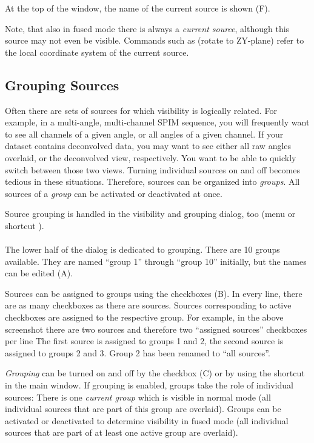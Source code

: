\documentclass{scrartcl}
\begin{document}
At the top of the window, the name of the current source is shown (F).

Note, that also in fused mode there is always a \emph{current source}, although this source may not even be visible.
Commands such as  (rotate to ZY-plane) refer to the local coordinate system of the current source.

%
\subsection{Grouping Sources}
Often there are sets of sources for which visibility is logically related.
For example, in a multi-angle, multi-channel SPIM sequence, you will frequently want to see all channels of a given angle, or all angles of a given channel.
If your dataset contains deconvolved data, you may want to see either all raw angles overlaid, or the deconvolved view, respectively.
You want to be able to quickly switch between those two views.
Turning individual sources on and off becomes tedious in these situations.
Therefore, sources can be organized into \emph{groups}.
All sources of a \emph{group} can be activated or deactivated at once.

Source grouping is handled in the visibility and grouping dialog, too
(menu  or shortcut ).
\\
\\
The lower half of the dialog is dedicated to grouping.
There are 10 groups available.
They are named ``group 1'' through ``group 10'' initially, but the names can be edited (A).

Sources can be assigned to groups using the checkboxes (B).
In every line, there are as many checkboxes as there are sources.
Sources corresponding to active checkboxes are assigned to the respective group.
For example, in the above screenshot there are two sources and therefore two ``assigned sources'' checkboxes per line
The first source is assigned to groups 1 and 2, the second source is assigned to groups 2 and 3.
Group 2 has been renamed to ``all sources''.

\emph{Grouping} can be turned on and off by the checkbox (C) or by using the shortcut  in the main window.
If grouping is enabled, groups take the role of individual sources:
There is one \emph{current group} which is visible in normal mode (all individual sources that are part of this group are overlaid).
Groups can be activated or deactivated to determine visibility in fused mode (all individual sources that are part of at least one active group are overlaid).
\end{document}
